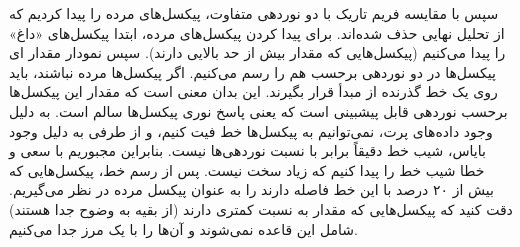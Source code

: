 \documentclass[12pt,a4paper]{article}
\begin{document}
	سپس با مقایسه فریم تاریک با دو نوردهی متفاوت، پیکسل‌های مرده را پیدا کردیم که از تحلیل نهایی حذف شده‌اند.
	برای پیدا کردن پیکسل‌های مرده، ابتدا پیکسل‌های «داغ» را پیدا می‌کنیم (پیکسل‌هایی که مقدار بیش از حد بالایی دارند).
	سپس نمودار مقدار ای پیکسل‌ها در دو نوردهی برحسب هم را رسم می‌کنیم. اگر پیکسل‌ها مرده نباشند، باید روی یک خط
	گذرنده از مبدأ قرار بگیرند. این بدان معنی است که مقدار این پیکسل‌ها برحسب نوردهی قابل پیشبینی است که یعنی
	پاسخ نوری پیکسل‌ها سالم است. به دلیل وجود داده‌های پرت، نمی‌توانیم به پیکسل‌ها خط فیت کنیم، و از طرفی به دلیل
	وجود بایاس، شیب خط دقیقاً برابر با نسبت نوردهی‌ها نیست. بنابراین مجبوریم با سعی و خطا شیب خط را پیدا کنیم که
	زیاد سخت نیست. پس از رسم خط، پیکسل‌هایی که بیش از ۲۰ درصد با این خط فاصله دارند را به عنوان پیکسل مرده در نظر
	می‌گیریم. دقت کنید که پیکسل‌هایی که مقدار به نسبت کمتری دارند (از بقیه به وضوح جدا هستند) شامل این قاعده نمی‌شوند
	و آن‌ها را با یک مرز جدا می‌کنیم.
	
\end{document}
